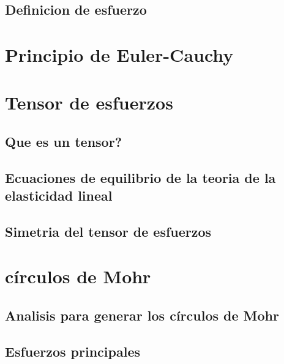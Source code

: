 \documentclass{article}
\begin{document}
    \subsection{Definicion de esfuerzo}
    \section{Principio de Euler-Cauchy}
    \section{Tensor de esfuerzos}
    \subsection{Que es un tensor?}
    \subsection{Ecuaciones de equilibrio de la teoria de la elasticidad lineal}
    \subsection{Simetria del tensor de esfuerzos}
    \section{círculos de Mohr}
    \subsection{Analisis para generar los círculos de Mohr}
    \subsection{Esfuerzos principales}
\end{document}
